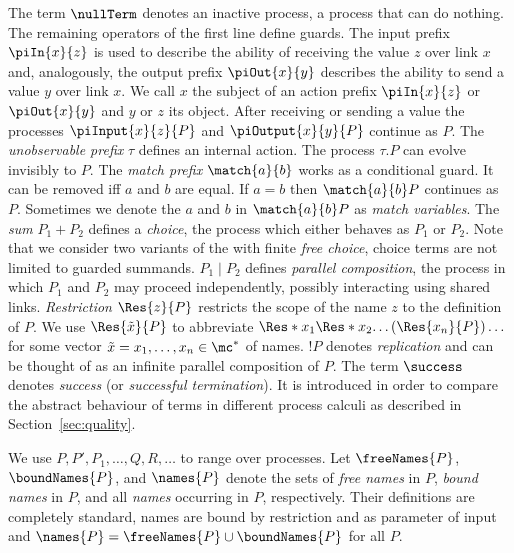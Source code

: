 \documentclass[]{article}
\begin{document}
\noindent
The term $ \nullTerm $ denotes an inactive process, \ie a process that can do nothing.
The remaining operators of the first line define guards.
The input prefix $ \piIn{x}{z} $ is used to describe the ability of receiving the value $ z $ over link $ x $ and, analogously, the output prefix $ \piOut{x}{y} $ describes the ability to send a value $ y $ over link $ x $. We call $ x $ the subject of an action prefix $ \piIn{x}{z} $ or $ \piOut{x}{y} $ and $ y $ or $ z $ its object. After receiving or sending a value the processes $ \piInput{x}{z}{P} $ and $ \piOutput{x}{y}{P} $ continue as $ P $.
The \emph{unobservable prefix} $ \tau $ defines an internal action. The process $ \tau.P $ can evolve invisibly to $ P $.
The \emph{match prefix} $ \match{a}{b} $ works as a conditional guard. It can be removed iff $ a $ and $ b $ are equal. If $ a = b $ then $ \match{a}{b}P $ continues as $ P $.
Sometimes we denote the $ a $ and $ b $ in $ \match{a}{b}P $ as \emph{match variables}.
The \emph{sum} $ P_1 + P_2 $ defines a \emph{choice}, \ie the process which either behaves as $ P_1 $ or $ P_2 $. Note that we consider two variants of the \piCal with finite \emph{free choice}, \ie choice terms are not limited to guarded summands.
$ P_1 \mid P_2 $ defines \emph{parallel composition}, \ie the process in which $ P_1 $ and $ P_2 $ may proceed independently, possibly interacting using shared links.
\emph{Restriction} $ \Res{z}{P} $ restricts the scope of the name $ z $ to the definition of $ P $. We use $ \Res{\tilde{x}}{P} $ to abbreviate $ \Res*{x_1}{ \Res*{x_2}{ \ldots (\Res{x_n}{P}) \ldots}} $ for some vector $ \tilde{x} = x_1, \ldots, x_n \in \mc^* $ of names.
$ !P $ denotes \emph{replication} and can be thought of as an infinite parallel composition of $ P $.
The term $ \success $ denotes \emph{success} (or \emph{successful termination}). It is introduced in order to compare the abstract behaviour of terms in different process calculi as described in Section~\ref{sec:quality}.

We use $ P, P', P_1, \ldots, Q, R, \ldots $ to range over processes. Let $ \freeNames{P} $, $ \boundNames{P} $, and $ \names{P} $ denote the sets of \emph{free names} in $ P $, \emph{bound names} in $ P $, and all \emph{names} occurring in $ P $, respectively. Their definitions are completely standard, \ie names are bound by restriction and as parameter of input and $ \names{P} = \freeNames{P} \cup \boundNames{P} $ for all $ P $.
\end{document}
